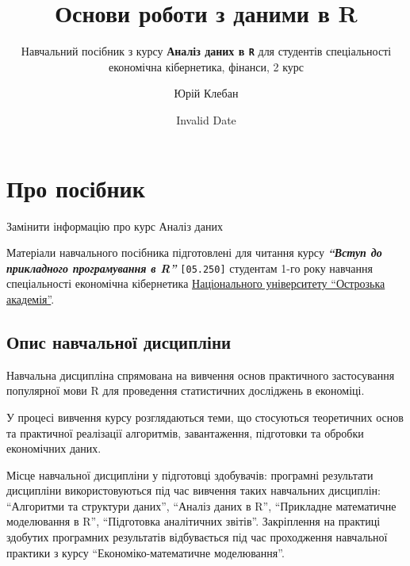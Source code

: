 \documentclass[
  letterpaper,
  DIV=11,
  numbers=noendperiod]{scrreprt}
\title{Основи роботи з даними в R}
\subtitle{Навчальний посібник з курсу \textbf{Аналіз даних в \texttt{R}}
для студентів спеціальності економічна кібернетика, фінанси, 2 курс}
\author{Юрій Клебан}
\date{Invalid Date}
\renewcommand*\contentsname{Зміст}
\newcommand\contentsname{Зміст}
\begin{document}
\maketitle

\renewcommand*\contentsname{Зміст}
{
\hypersetup{linkcolor=}
\setcounter{tocdepth}{2}
\tableofcontents
}


\chapter*{Про
посібник}\label{ux43fux440ux43e-ux43fux43eux441ux456ux431ux43dux438ux43a}


\href{https://doi.org/10.5281/zenodo.7251419}{}

Замінити інформацію про курс Аналіз даних

Матеріали навчального посібника підготовлені для читання курсу
\textbf{\emph{``Вступ до прикладного програмування в R''}}
\texttt{{[}05.250{]}} студентам 1-го року навчання спеціальності
економічна кібернетика \href{https://oa.edu.ua}{Національного
університету ``Острозька академія''}.

\section*{Опис навчальної
дисципліни}\label{ux43eux43fux438ux441-ux43dux430ux432ux447ux430ux43bux44cux43dux43eux457-ux434ux438ux441ux446ux438ux43fux43bux456ux43dux438}


Навчальна дисципліна спрямована на вивчення основ практичного
застосування популярної мови R для проведення статистичних досліджень в
економіці.

У процесі вивчення курсу розглядаються теми, що стосуються теоретичних
основ та практичної реалізації алгоритмів, завантаження, підготовки та
обробки економічних даних.

Місце навчальної дисципліни у підготовці здобувачів: програмні
результати дисципліни використовуються під час вивчення таких навчальних
дисциплін: ``Алгоритми та структури даних'', ``Аналіз даних в R'',
``Прикладне математичне моделювання в R'', ``Підготовка аналітичних
звітів''. Закріплення на практиці здобутих програмних результатів
відбувається під час проходження навчальної практики з курсу
``Економіко-математичне моделювання''.
\end{document}
